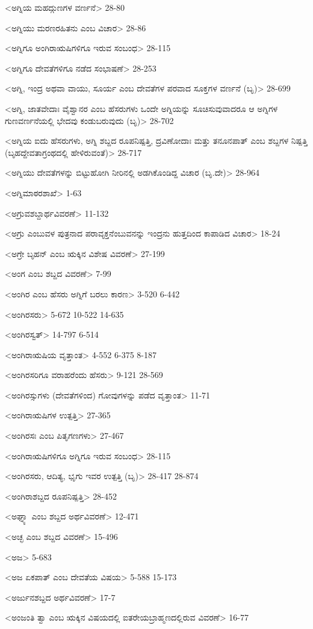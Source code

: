 <ಅಗ್ನಿಯ ಮಹದ್ಗುಣಗಳ ವರ್ಣನೆ>
28-80

<ಅಗ್ನಿಯು ಮರಣರಹಿತನು ಎಂಬ ವಿಚಾರ>
28-86

<ಅಗ್ನಿಗೂ ಅಂಗಿರಾಋಷಿಗಳಿಗೂ ಇರುವ ಸಂಬಂಧ>
28-115

<ಅಗ್ನಿಗೂ ದೇವತೆಗಳಿಗೂ ನಡೆದ ಸಂಭಾಷಣೆ>
28-253

<ಅಗ್ನಿ, ಇಂದ್ರ ಅಥವಾ ವಾಯು, ಸೂರ್ಯ ಎಂಬ ದೇವತೆಗಳ ಪರವಾದ ಸೂಕ್ತಗಳ ವರ್ಣನೆ (ಬೃ)>
28-699

<ಅಗ್ನಿ, ಜಾತವೇದಾಃ ವೈಶ್ವಾನರ ಎಂಬ ಹೆಸರುಗಳು ಒಂದೇ ಅಗ್ನಿಯನ್ನು ಸೂಚಿಸುವುವಾದರೂ ಆ ಅಗ್ನಿಗಳ ಗುಣವರ್ಣನೆಯಲ್ಲಿ ಭೇದವು ಕಂಡುಬರುವುದು (ಬೃ)>
28-702

<ಅಗ್ನಿಯ ಐದು ಹೆಸರುಗಳು, ಅಗ್ನಿ ಶಬ್ದದ ರೂಪನಿಷ್ಪತ್ತಿ, ದ್ರವಿಣೋದಾಃ ಮತ್ತು ತನೂನಪಾತ್‍ ಎಂಬ ಶಬ್ದಗಳ ನಿಷ್ಪತ್ತಿ (ಬೃಹದ್ದೇವತಾಗ್ರಂಥದಲ್ಲಿ ಹೇಳಿರುವಂತೆ)>
28-717

<ಅಗ್ನಿಯು ದೇವತೆಗಳನ್ನು ಬಿಟ್ಟುಹೋಗಿ ನೀರಿನಲ್ಲಿ ಅಡಗಿಕೊಂಡಿದ್ದ ವಿಚಾರ (ಬೃ.ದೇ)>
28-964

<ಅಗ್ನಿಮಾಠರಶಾಖೆ>
1-63

<ಅಗ್ರುವಶಬ್ದಾರ್ಥವಿವರಣೆ>
11-132

<ಅಗ್ರು ಎಂಬುವಳ ಪುತ್ರನಾದ ಪರಾವೃಕ್ತನೆಂಬುವನನ್ನು ಇಂದ್ರನು ಹುತ್ತದಿಂದ ಕಾಪಾಡಿದ ವಿಚಾರ>
18-24

<ಅಗ್ರೇ ಬೃಹನ್‍ ಎಂಬ ಋಕ್ಕಿನ ವಿಶೇಷ ವಿವರಣೆ>
27-199

<ಅಂಗ ಎಂಬ ಶಬ್ದದ ವಿವರಣೆ>
7-99

<ಅಂಗಿರ ಎಂಬ ಹೆಸರು ಅಗ್ನಿಗೆ ಬರಲು ಕಾರಣ>
3-520 
6-442

<ಅಂಗಿರಸರು>
5-672 
10-522 
14-635

<ಅಂಗಿರಸ್ವತ್‍>
14-797 
6-514

<ಅಂಗಿರಾಋಷಿಯ ವೃತ್ತಾಂತ>
4-552 
6-375 
8-187

<ಅಂಗಿರಸರಿಗೂ ವರಾಹರೆಂದು ಹೆಸರು>
9-121 
28-569

<ಅಂಗಿರಸ್ಸುಗಳು (ದೇವತೆಗಳಿಂದ) ಗೋವುಗಳನ್ನು ಪಡೆದ ವೃತ್ತಾಂತ>
11-71

<ಅಂಗಿರಾಋಷಿಗಳ ಉತ್ಪತ್ತಿ>
27-365

<ಅಂಗಿರಸಃ ಎಂಬ ಪಿತೃಗಣಗಳು>
27-467

<ಅಂಗಿರಾಋಷಿಗಳಿಗೂ ಅಗ್ನಿಗೂ ಇರುವ ಸಂಬಂಧ>
28-115

<ಅಂಗಿರಸರು, ಆದಿತ್ಯ, ಭೃಗು ಇವರ ಉತ್ಪತ್ತಿ (ಬೃ)>
28-417 
28-874

<ಅಂಗಿರಾಶಬ್ದದ ರೂಪನಿಷ್ಪತ್ತಿ>
28-452

<ಅಘ್ನ್ಯಾ ಎಂಬ ಶಬ್ದದ ಅರ್ಥವಿವರಣೆ>
12-471

<ಅಚ್ಛ ಎಂಬ ಶಬ್ದದ ವಿವರಣೆ>
15-496

<ಅಜ>
5-683

<ಅಜ ಏಕಪಾತ್‍ ಎಂಬ ದೇವತೆಯ ವಿಷಯ>
5-588 
15-173

<ಅರ್ಜುನಶಬ್ದದ ಅರ್ಥವಿವರಣೆ>
17-7

<ಅಂಜಂತಿ ತ್ವಾ ಎಂಬ ಋಕ್ಕಿನ ವಿಷಯದಲ್ಲಿ ಐತರೇಯಬ್ರಾಹ್ಮಣದಲ್ಲಿರುವ ವಿವರಣೆ>
16-77

